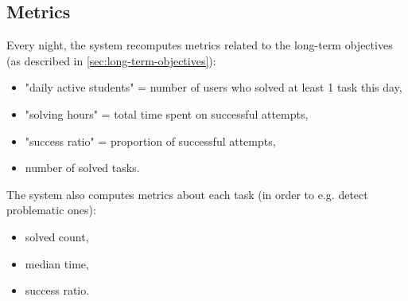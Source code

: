 



\subsection{Metrics}
\label{sec:robomission.metrics}

Every night, the system recomputes metrics related to the long-term objectives
(as described in \ref{sec:long-term-objectives}):

\begin{itemize}
\item "daily active students" = number of users who solved at least 1 task this day,
\item "solving hours" = total time spent on successful attempts,
\item "success ratio" = proportion of successful attempts,
\item number of solved tasks.
\end{itemize}


The system also computes metrics about each task (in order to e.g. detect problematic ones):
\begin{itemize}
\item solved count,
\item median time,
\item success ratio.
\end{itemize}




%



